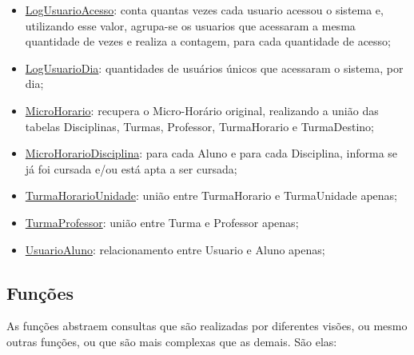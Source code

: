 \documentclass[graduacao,brazil]{ThesisPUC}
\begin{document}
\begin{itemize}
	\item \underline{LogUsuarioAcesso}: conta quantas vezes cada usuario acessou o sistema e, utilizando esse valor, agrupa-se os usuarios que acessaram a mesma quantidade de vezes e realiza a contagem, para cada quantidade de acesso;
	\item \underline{LogUsuarioDia}: quantidades de usuários únicos que acessaram o sistema, por dia;
	\item \underline{MicroHorario}: recupera o Micro-Horário original, realizando a união das tabelas Disciplinas, Turmas, Professor, TurmaHorario e TurmaDestino;
	\item \underline{MicroHorarioDisciplina}: para cada Aluno e para cada Disciplina, informa se já foi cursada e/ou está apta a ser cursada;
	\item \underline{TurmaHorarioUnidade}: união entre TurmaHorario e TurmaUnidade apenas;
	\item \underline{TurmaProfessor}: união entre Turma e Professor apenas;
	\item \underline{UsuarioAluno}: relacionamento entre Usuario e Aluno apenas;
\end{itemize}

\subsection{Funções}

As funções abstraem consultas que são realizadas por diferentes visões, ou mesmo outras funções, ou que são mais complexas que as demais. São elas:
\end{document}
